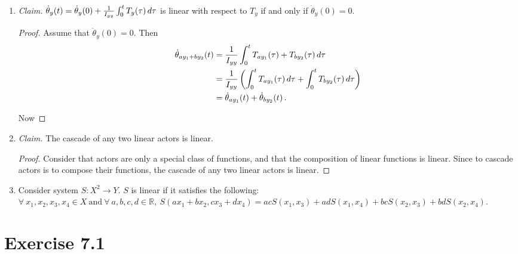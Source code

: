 \documentclass{abrice}
\begin{document}
\begin{enumerate}[label=(\alph*)]
\item \textit{Claim.} $\dot{\theta}_y(t) = \dot{\theta}_y(0) + {1 \over I_{yy}}
  \int_0^t T_y(\tau)\, d\tau$ is linear with respect to $T_y$ if and only if
  $\dot{\theta}_y(0) = 0$.
  \begin{proof} Assume that $\dot{\theta}_y(0) = 0$. Then
    \begin{align*}
      \dot{\theta}_{ay_1 + by_2}(t)
      &= {1 \over I_{yy}} \int_0^t T_{ay_1}(\tau) + T_{by_2}(\tau)\, d\tau \\
      &= {1 \over I_{yy}} \left( \int_0^t T_{ay_1} (\tau)\, d\tau + \int_0^t
        T_{by_2} (\tau)\, d\tau \right) \\
      &= \dot{\theta}_{ay_1}(t) + \dot{\theta}_{by_2}(t)\, .
    \end{align*}

    Now
  \end{proof}
\item \textit{Claim.} The cascade of any two linear actors is linear.
  \begin{proof}
    Consider that actors are only a special class of functions, and that the
    composition of linear functions is linear. Since to cascade actors is to
    compose their functions, the cascade of any two linear actors is linear.
  \end{proof}
\item Consider system $S: X^2 \rightarrow Y$. $S$ is linear if it satisfies the
  following:
  $\forall\ x_1, x_2, x_3, x_4 \in X\ \textrm{and}\ \forall\ a,b,c,d \in
  \mathbb{R},\ S(ax_1 + bx_2, cx_3 + dx_4) = acS(x_1, x_3) + adS(x_1, x_4) +
  bcS(x_2, x_3) + bdS(x_2, x_4)$.
\end{enumerate}

\section{Exercise 7.1}
\end{document}
